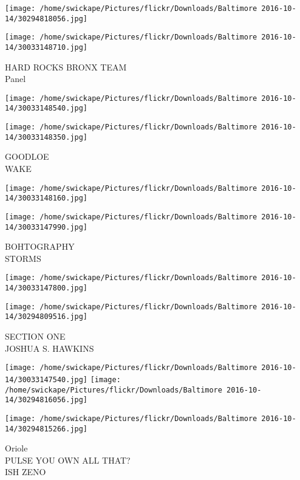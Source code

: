 \documentclass[10pt,letterpaper]{article}
\begin{document}
\texttt{[image: /home/swickape/Pictures/flickr/Downloads/Baltimore 2016-10-14/30294818056.jpg]}

\vspace{0.25in}
\texttt{[image: /home/swickape/Pictures/flickr/Downloads/Baltimore 2016-10-14/30033148710.jpg]}

HARD ROCKS BRONX TEAM\\
Panel\\
\pagebreak

\texttt{[image: /home/swickape/Pictures/flickr/Downloads/Baltimore 2016-10-14/30033148540.jpg]}

\vspace{0.25in}
\texttt{[image: /home/swickape/Pictures/flickr/Downloads/Baltimore 2016-10-14/30033148350.jpg]}

GOODLOE\\
WAKE\\
\pagebreak

\texttt{[image: /home/swickape/Pictures/flickr/Downloads/Baltimore 2016-10-14/30033148160.jpg]}

\vspace{0.25in}
\texttt{[image: /home/swickape/Pictures/flickr/Downloads/Baltimore 2016-10-14/30033147990.jpg]}

BOHTOGRAPHY\\
STORMS\\
\pagebreak

\texttt{[image: /home/swickape/Pictures/flickr/Downloads/Baltimore 2016-10-14/30033147800.jpg]}

\vspace{0.25in}
\texttt{[image: /home/swickape/Pictures/flickr/Downloads/Baltimore 2016-10-14/30294809516.jpg]}

SECTION ONE\\
JOSHUA S. HAWKINS\\
\pagebreak

\texttt{[image: /home/swickape/Pictures/flickr/Downloads/Baltimore 2016-10-14/30033147540.jpg]}
\texttt{[image: /home/swickape/Pictures/flickr/Downloads/Baltimore 2016-10-14/30294816056.jpg]}

\vspace{0.25in}
\texttt{[image: /home/swickape/Pictures/flickr/Downloads/Baltimore 2016-10-14/30294815266.jpg]}

Oriole\\
PULSE YOU OWN ALL THAT?\\
ISH ZENO\\
\pagebreak
\end{document}
